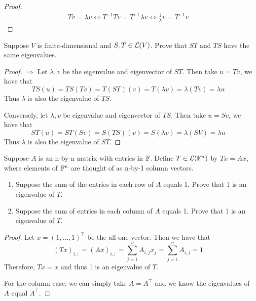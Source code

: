 \documentclass{extarticle}
\begin{document}
\begin{proof}
\begin{align*}
    Tv  = \lambda v  \Longleftrightarrow T^{-1} T v = T^{-1} \lambda v \Longleftrightarrow 
    \frac{1}{\lambda} v = T^{-1} v   
\end{align*}
\end{proof}


\begin{problem}{23}
    Suppose \(V\) is finite-dimensional and \(S, T \in \mathcal{L}(V)\). Prove that \(ST\) and \(TS\)
    have the same eigenvalues. 
\end{problem}

\begin{proof}
\(\Rightarrow\) Let \(\lambda, v\) be the eigenvalue and eigenvector of \(ST\). Then take 
\(u = Tv\), we have that 
\[TS(u) = TS(Tv) = T(ST)(v) = T (\lambda v) = \lambda (Tv) = \lambda u\]
Thus \(\lambda\) is also the eigenvalue of \(TS\). 

Conversely, let \(\lambda, v\) be eigenvalue and eigenvector of \(TS\). Then take 
\(u = Sv\), we have that 
\[ST(u) = ST(Sv) = S(TS) (v) = S(\lambda v) = \lambda (SV) = \lambda u\]
Thus \(\lambda\) is also the eigenvalue of \(ST\). 
\end{proof}


\begin{problem}{24}
    Suppose \(A\) is an n-by-n matrix with entries in \(\mathbb{F}\). Define 
    \(T \in \mathcal{L}(\mathbb{F}^n)\) by \(Tx = Ax\), where elements of \(\mathbb{F}^n\) are thought of 
    as n-by-1 column vectors. 
    \begin{enumerate}[label=(\alph*)]
        \item Suppose the sum of the entries in each row of \(A\) equals 1. Prove that 
        1 is an eigenvalue of \(T\).
        \item Suppose the sum of entries in each column of \(A\) equals 1. Prove that 
        1 is an eigenvalue of \(T\).
    \end{enumerate}
\end{problem}

\begin{proof}
Let \(x = (1, \ldots, 1)^\top\) be the all-one vector. Then we have that 
\[(Tx)_{i, \colon} = (Ax)_{i, \colon} = \sum_{j=1}^{n} A_{i, j} x_j = \sum_{j=1}^{n} A_{i, j} = 1\]
Therefore, \(Tx = x\) and thus 1 is an eigenvalue of \(T\). 

For the column case, we can simply take \(A = A^\top\) and we know the eigenvalues of \(A\) equal 
\(A^\top\). 

\end{proof}
\end{document}
